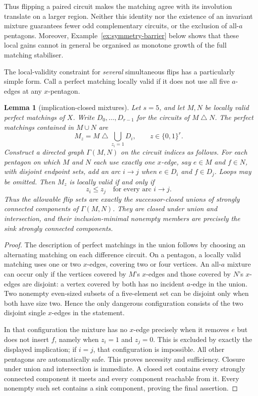 \documentclass[11pt,a4paper]{article}
\newtheorem{lemma}[theorem]{Lemma}
\theoremstyle{definition}
\theoremstyle{remark}
\begin{document}
Thus flipping a paired circuit makes the matching agree with its involution translate on a larger region.  Neither this identity nor the existence of an invariant mixture guarantees fewer odd complementary circuits, or the exclusion of all-$a$ pentagons.  Moreover, Example~\ref{ex:symmetry-barrier} below shows that these local gains cannot in general be organised as monotone growth of the full matching stabiliser.

The local-validity constraint for \emph{several} simultaneous flips has a particularly simple form.  Call a perfect matching locally valid if it does not use all five $a$-edges at any $x$-pentagon.
\begin{lemma}[implication-closed mixtures]\label{lem:mixture-implications}
Let $s=5$, and let $M,N$ be locally valid perfect matchings of $X$.  Write $D_0,\ldots,D_{r-1}$ for the circuits of $M\mathbin\triangle N$.  The perfect matchings contained in $M\cup N$ are
\[
 M_z=M\mathbin\triangle\bigcup_{z_i=1}D_i,
 \qquad z\in\{0,1\}^r.
\]
Construct a directed graph $\Gamma(M,N)$ on the circuit indices as follows.  For each pentagon on which $M$ and $N$ each use exactly one $x$-edge, say $e\in M$ and $f\in N$, with disjoint endpoint sets, add an arc $i\to j$ when $e\in D_i$ and $f\in D_j$.  Loops may be omitted.  Then $M_z$ is locally valid if and only if
\[
 z_i\le z_j\quad\text{for every arc }i\to j.
\]
Thus the allowable flip sets are exactly the successor-closed unions of strongly connected components of $\Gamma(M,N)$.  They are closed under union and intersection, and their inclusion-minimal nonempty members are precisely the sink strongly connected components.
\end{lemma}
\begin{proof}
The description of perfect matchings in the union follows by choosing an alternating matching on each difference circuit.  On a pentagon, a locally valid matching uses one or two $x$-edges, covering two or four vertices.  An all-$a$ mixture can occur only if the vertices covered by $M$'s $x$-edges and those covered by $N$'s $x$-edges are disjoint: a vertex covered by both has no incident $a$-edge in the union.  Two nonempty even-sized subsets of a five-element set can be disjoint only when both have size two.  Hence the only dangerous configuration consists of the two disjoint single $x$-edges in the statement.

In that configuration the mixture has no $x$-edge precisely when it removes $e$ but does not insert $f$, namely when $z_i=1$ and $z_j=0$.  This is excluded by exactly the displayed implication; if $i=j$, that configuration is impossible.  All other pentagons are automatically safe.  This proves necessity and sufficiency.  Closure under union and intersection is immediate.  A closed set contains every strongly connected component it meets and every component reachable from it.  Every nonempty such set contains a sink component, proving the final assertion.
\end{proof}
\end{document}
